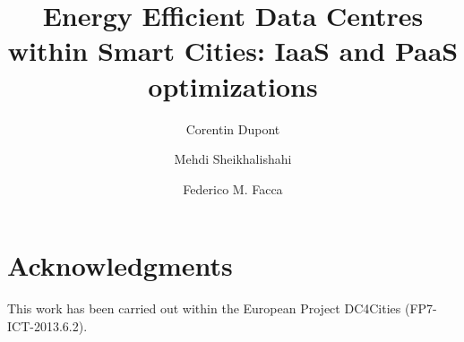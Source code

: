 \documentclass[lnicst]{svmultln}
\begin{document}
%
\mainmatter              %
%
\title{Energy Efficient Data Centres within Smart Cities: IaaS and PaaS optimizations}
%
\author{Corentin Dupont\and Mehdi Sheikhalishahi\and Federico M. Facca }
%
%
%

\maketitle              %

\begin{abstract}        %


\end{abstract}
%








\section*{Acknowledgments}

This work has been carried out within the European Project DC4Cities (FP7-ICT-2013.6.2).

\begin{thebibliography}{5}


\end{thebibliography}
\end{document}
